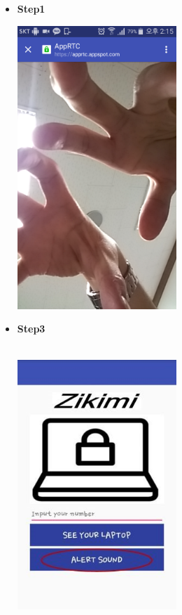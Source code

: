 \documentclass[12pt]{article}
\begin{document}
\begin{itemize}

\item\textbf{Step1}\\ 
\begin{center}
\includegraphics[width=60mm,scale=1]{warningstep1}
\end{center}
\item\textbf{Step3}\\
 \\ 

\begin{center} 
\includegraphics[width=60mm,scale=1]{warningstep3}
\end{center}

\end{itemize}
\end{document}
